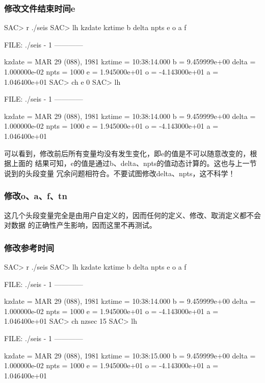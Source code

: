 \subsubsection{修改文件结束时间e}
\begin{SACCode}
SAC> r ./seis 
SAC> lh kzdate kztime b delta npts e o a f 
  
  FILE: ./seis - 1
 ------------

     kzdate = MAR 29 (088), 1981
     kztime = 10:38:14.000
          b = 9.459999e+00
      delta = 1.000000e-02
       npts = 1000
          e = 1.945000e+01
          o = -4.143000e+01
          a = 1.046400e+01
SAC> ch e 0
SAC> lh
  
  FILE: ./seis - 1
 ------------

     kzdate = MAR 29 (088), 1981
     kztime = 10:38:14.000
          b = 9.459999e+00
      delta = 1.000000e-02
       npts = 1000
          e = 1.945000e+01
          o = -4.143000e+01
          a = 1.046400e+01
\end{SACCode}

可以看到，修改前后所有变量均没有发生变化，即e的值是不可以随意改变的，根据上面的
结果可知，e的值是通过b、delta、npts的值动态计算的。这也与上一节说到的头段变量
冗余问题相符合。不要试图修改delta、npts，这不科学！

\subsubsection{修改o、a、f、tn}
这几个头段变量完全是由用户自定义的，因而任何的定义、修改、取消定义都不会对数据
的正确性产生影响，因而这里不再测试。

\subsubsection{修改参考时间}
\begin{SACCode}
SAC> r ./seis 
SAC> lh kzdate kztime b delta npts e o a f
  
  FILE: ./seis - 1
 ------------

     kzdate = MAR 29 (088), 1981
     kztime = 10:38:14.000
          b = 9.459999e+00
      delta = 1.000000e-02
       npts = 1000
          e = 1.945000e+01
          o = -4.143000e+01
          a = 1.046400e+01
SAC> ch nzsec 15
SAC> lh
  
  FILE: ./seis - 1
 ------------

     kzdate = MAR 29 (088), 1981
     kztime = 10:38:15.000
          b = 9.459999e+00
      delta = 1.000000e-02
       npts = 1000
          e = 1.945000e+01
          o = -4.143000e+01
          a = 1.046400e+01

\end{SACCode}

